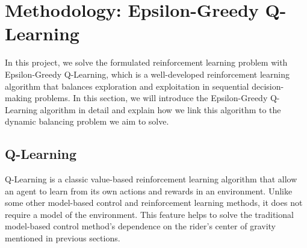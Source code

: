 \documentclass[10pt,a4paper]{article}
\begin{document}
	
	
	
	\section{Methodology: Epsilon-Greedy Q-Learning}
	In this project, we solve the formulated reinforcement learning problem with Epsilon-Greedy Q-Learning, which is a well-developed reinforcement learning algorithm that balances exploration and exploitation in sequential decision-making problems. In this section, we will introduce the Epsilon-Greedy Q-Learning algorithm in detail and explain how we link this algorithm to the dynamic balancing problem we aim to solve. 
	
	\subsection{Q-Learning}
	Q-Learning is a classic value-based reinforcement learning algorithm that allow an agent to learn from its own actions and rewards in an environment. Unlike some other model-based control and reinforcement learning methods, it does not require a model of the environment. This feature helps to solve the traditional model-based control method's dependence on the rider's center of gravity mentioned in previous sections. 
	
\end{document}
